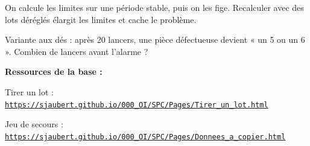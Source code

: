 \documentclass[10pt,a4paper]{article}
\begin{document}
\begin{tcolorbox}[retenir]On calcule les limites sur une période stable, puis on les fige. Recalculer avec des lots déréglés élargit les limites et cache le problème.\end{tcolorbox}
\begin{tcolorbox}[plus]Variante aux dés : après 20 lancers, une pièce défectueuse devient « un 5 ou un 6 ». Combien de lancers avant l'alarme ?\end{tcolorbox}
\vfill{\footnotesize\color{uimm}\textbf{Ressources de la base :}\par Tirer un lot : \href{https://sjaubert.github.io/000_OI/SPC/Pages/Tirer_un_lot.html}{\nolinkurl{https://sjaubert.github.io/000_OI/SPC/Pages/Tirer_un_lot.html}}\par Jeu de secours : \href{https://sjaubert.github.io/000_OI/SPC/Pages/Donnees_a_copier.html\#lots35}{\nolinkurl{https://sjaubert.github.io/000_OI/SPC/Pages/Donnees_a_copier.html}}}
\end{document}

